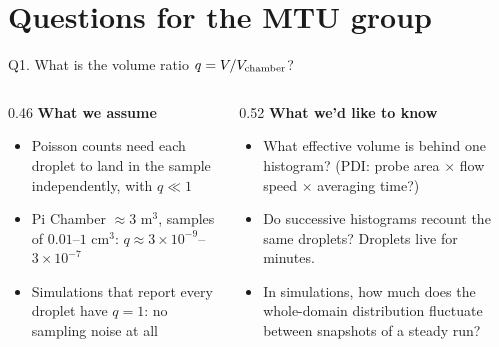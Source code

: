 \documentclass[aspectratio=169,10pt]{beamer}
\newcommand{\ask}[1]{\textcolor{askcol}{\textbf{#1}}}
\begin{document}
\section{Questions for the MTU group}

\begin{frame}{Q1. What is the volume ratio $q = V/V_{\rm chamber}$?}
\begin{columns}[T]
\begin{column}{0.46\textwidth}
\textbf{What we assume}
\begin{itemize}
\item Poisson counts need each droplet to land in the sample independently, with $q \ll 1$
\item Pi Chamber $\approx3$ m$^3$, samples of $0.01$--$1$ cm$^3$: $q\approx3\times10^{-9}$--$3\times10^{-7}$
\item Simulations that report every droplet have $q = 1$: no sampling noise at all
\end{itemize}
\end{column}
\begin{column}{0.52\textwidth}
\ask{What we'd like to know}
\begin{itemize}
\item What effective volume is behind one histogram? (PDI: probe area $\times$ flow speed $\times$ averaging time?)
\item Do successive histograms recount the same droplets? Droplets live for minutes.
\item In simulations, how much does the whole-domain distribution fluctuate between snapshots of a steady run?
\end{itemize}
\end{column}
\end{columns}
\end{frame}
\end{document}
